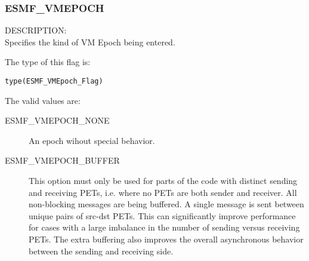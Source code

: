 

\subsubsection{ESMF\_VMEPOCH}
\label{const:vmepoch_flag}

{\sf DESCRIPTION:\\}
Specifies the kind of VM Epoch being entered.

The type of this flag is:

{\tt type(ESMF\_VMEpoch\_Flag)}

The valid values are:
\begin{description}
  \item [ESMF\_VMEPOCH\_NONE] 
    An epoch wihout special behavior.
  \item [ESMF\_VMEPOCH\_BUFFER]
    This option must only be used for parts of the code with distinct sending
    and receiving PETs, i.e. where no PETs are both sender and receiver.
    All non-blocking messages are being buffered. A single message is sent
    between unique pairs of src-dst PETs. This can significantly improve
    performance for cases with a large imbalance in the number of sending
    versus receiving PETs. The extra buffering also improves the overall
    asynchronous behavior between the sending and receiving side.
\end{description}

